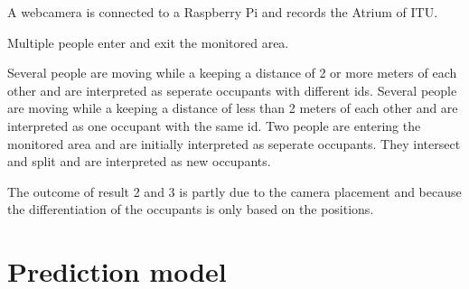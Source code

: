 A webcamera is connected to a Raspberry Pi and records the Atrium of ITU.

Multiple people enter and exit the monitored area.

\begin{enumerate}
Several people are moving while a keeping a distance of 2 or more meters of each other and are interpreted as seperate occupants with different ids.
Several people are moving while a keeping a distance of less than 2 meters of each other and are interpreted as one occupant with the same id.
Two people are entering the monitored area and are initially interpreted as seperate occupants. They intersect and split and are interpreted as new occupants.
\end{enumerate}

The outcome of result 2 and 3 is partly due to the camera placement and because the differentiation of the occupants is only based on the positions. 

\section{Prediction model}
\label{eval_prediction}